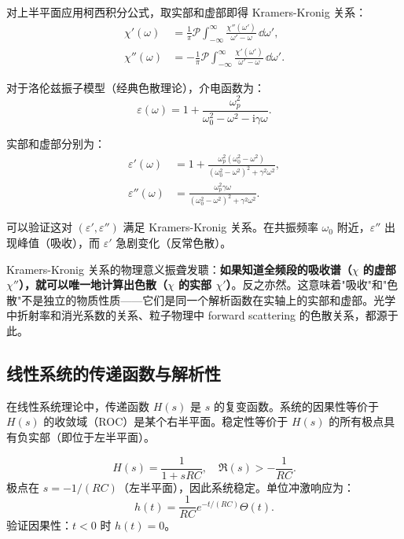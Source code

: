 对上半平面应用柯西积分公式，取实部和虚部即得 Kramers-Kronig 关系：
\begin{align}
\chi'(\omega) &= \frac{1}{\pi}\mathcal{P}\int_{-\infty}^{\infty}
\frac{\chi''(\omega')}{\omega' - \omega}\,\dd\omega',\\
\chi''(\omega) &= -\frac{1}{\pi}\mathcal{P}\int_{-\infty}^{\infty}
\frac{\chi'(\omega')}{\omega' - \omega}\,\dd\omega'.
\label{eq:kk_relations}
\end{align}

\begin{example}[洛伦兹振子模型]
对于洛伦兹振子模型（经典色散理论），介电函数为：
\begin{equation}
\varepsilon(\omega) = 1 + \frac{\omega_p^2}{\omega_0^2 - \omega^2 - \mathrm{i}\gamma\omega}.
\end{equation}

实部和虚部分别为：
\begin{align}
\varepsilon'(\omega) &= 1 + \frac{\omega_p^2(\omega_0^2 - \omega^2)}{(\omega_0^2 - \omega^2)^2 + \gamma^2\omega^2},\\
\varepsilon''(\omega) &= \frac{\omega_p^2\gamma\omega}{(\omega_0^2 - \omega^2)^2 + \gamma^2\omega^2}.
\end{align}

可以验证这对 $(\varepsilon',\varepsilon'')$ 满足 Kramers-Kronig 关系。在共振频率 $\omega_0$ 附近，$\varepsilon''$ 出现峰值（吸收），而 $\varepsilon'$ 急剧变化（反常色散）。
\end{example}

\begin{insight}
Kramers-Kronig 关系的物理意义振聋发聩：\textbf{如果知道全频段的吸收谱（$\chi$ 的虚部 $\chi''$），就可以唯一地计算出色散（$\chi$ 的实部 $\chi'$）}。反之亦然。这意味着"吸收"和"色散"不是独立的物质性质——它们是同一个解析函数在实轴上的实部和虚部。光学中折射率和消光系数的关系、粒子物理中 forward scattering 的色散关系，都源于此。
\end{insight}

\subsection{线性系统的传递函数与解析性}

在线性系统理论中，传递函数 $H(s)$ 是 $s$ 的复变函数。系统的因果性等价于 $H(s)$ 的收敛域（ROC）是某个右半平面。稳定性等价于 $H(s)$ 的所有极点具有负实部（即位于左半平面）。

\begin{example}[RC 低通滤波器的传递函数]
\begin{equation}
H(s) = \frac{1}{1 + sRC},\quad \Re(s) > -\frac{1}{RC}.
\end{equation}
极点在 $s = -1/(RC)$（左半平面），因此系统稳定。单位冲激响应为：
\begin{equation}
h(t) = \frac{1}{RC}e^{-t/(RC)}\Theta(t).
\end{equation}
验证因果性：$t<0$ 时 $h(t)=0$。
\end{example}


